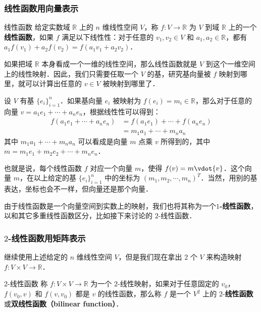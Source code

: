 \subsubsection{线性函数用向量表示}
\begin{definition}{线性函数}
给定实数域 $\mathbb{R}$ 上的 $n$ 维线性空间 $V$，称 $f:V\rightarrow \mathbb{R}$ 为 $V$ 到域 $\mathbb{R}$ 上的一个\textbf{线性函数}，如果 $f$ 满足以下线性性：对于任意的 ${v}_1, {v}_2\in V$ 和 $a_1, a_2\in\mathbb{R}$，都有 $a_1f({v}_1)+a_2f({v}_2)=f(a_1{v}_1+a_2{v}_2)$．
\end{definition}

如果把域 $\mathbb{R}$ 本身看成一个一维的线性空间，那么线性函数就是 $V$ 到这个一维空间上的线性映射．因此，我们只需要任取一个 $V$ 的基，研究基向量被 $f$ 映射到哪里，就可以计算出任意的 ${v}\in V$ 被映射到哪里了．

设 $V$ 有基 $\{{e}_i\}_{i=1}^n$．如果基向量 ${e}_i$ 被映射为 $f({e}_i)=m_i\in\mathbb{R}$，那么对于任意的向量 ${v}=a_1{e}_1+\cdots+a_n{e}_n$，根据线性性可以得到：
\begin{equation}
\begin{aligned}
f(a_1{e}_1+\cdots+a_n{e}_n)&=f(a_1{e}_1)+\cdots+f(a_n{e}_n)\\
&=m_1a_1+\cdots+m_na_n
\end{aligned}
\end{equation}
其中 $m_1a_1+\cdots+m_na_n$ 可以看成是向量 ${m}$ 点乘 ${v}$ 所得到的，其中 ${m}=m_1{e}_1+m_2{e}_2+\cdots+m_n{e}_n$．

也就是说，每个线性函数 $f$ 对应一个向量 ${m}$，使得 $f({v})={m}\vdot{v}$．这个向量 ${m}$，在以上给定的基 $\{{e}_i\}_{i=1}^n$ 中的坐标为 $(m_1, m_2, \cdots, m_n)^T$．当然，用别的基表达，坐标也会不一样，但向量还是那个向量．

由于线性函数是一个向量空间到实数上的映射，我们也将其称为一个\textbf{$1$-线性函数}，以和其它多重线性函数区分，比如接下来讨论的 $2$-线性函数．

\subsubsection{$2$-线性函数用矩阵表示}

继续使用上述给定的 $n$ 维线性空间 $V$，但是我们现在拿出 $2$ 个 $V$ 来构造映射 $f:V\times V\rightarrow\mathbb{R}$．

\begin{definition}{$2$-线性函数}
称 $f:V\times V\rightarrow\mathbb{R}$ 为一个 $2$-线性映射，如果对于任意固定的 ${v}_0$，$f({v}_0, {v})$ 和 $f({v}, {v}_0)$ 都是 ${v}$ 的线性函数，那么称 $f$ 是一个 $V^2$ 上的 $2$-\textbf{线性函数}或\textbf{双线性函数（bilinear function）}．
\end{definition}

